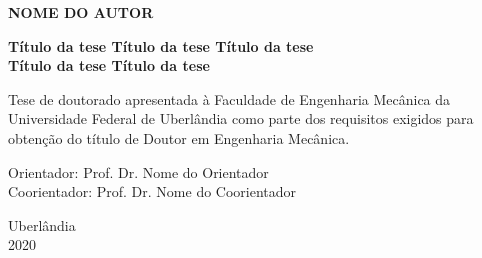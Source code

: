 \clearpage
\thispagestyle{fancy}
\fancyhf{}
\vspace*{2.5cm}
\begin{center}
	
	{\large \textbf{NOME DO AUTOR}}
	
	\vspace*{2.8cm}
	{\fontsize{23}{23} \textbf{Título da tese Título da tese Título da tese}}	\\ \vspace{1.2ex}
	{\fontsize{23}{23} \textbf{Título da tese Título da tese}}\\ \vspace{1.2ex}
\end{center}

\vspace*{2.5cm}
\begin{flushright}
	\parbox{3.5in}{ Tese de doutorado apresentada à Faculdade de 
		Engenharia Mecânica da Universidade Federal de Uberlândia como parte dos requisitos exigidos para 
		obtenção do título de Doutor em Engenharia Mecânica.}
\end{flushright}

\vspace{1.0cm}
\noindent
Orientador: Prof. Dr. Nome do Orientador\\
\noindent
Coorientador: Prof. Dr. Nome do Coorientador\\

\vspace{6.5cm}
\begin{center}
	Uberlândia\\2020
\end{center}
